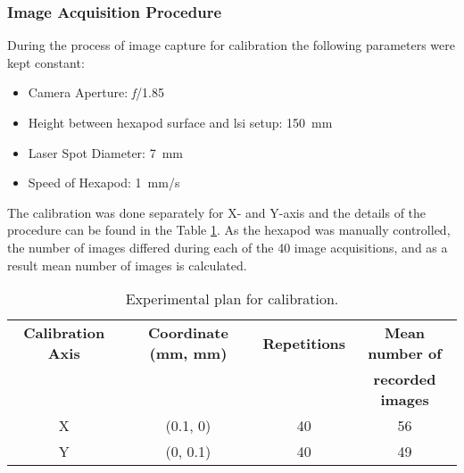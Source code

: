     \subsubsection*{Image Acquisition Procedure}\label{subsubsection:image_acq_calib}
        During the process of image capture for calibration the following parameters were kept constant:
        \begin{itemize}
            \item Camera Aperture: \emph{f}/1.85
            \item Height between hexapod surface and \gls{lsi} setup: \SI{150}{\milli\meter}
            \item Laser Spot Diameter: \SI{7}{\milli\meter}
            \item Speed of Hexapod: \SI{1}{\milli\meter/\second}
        \end{itemize}
        
        \noindent The calibration was done separately for X- and Y-axis and the details of the procedure can be found in the Table \ref{table:calibration_plan}. As the hexapod was manually controlled, the number of images differed during each of the 40 image acquisitions, and as a result mean number of images is calculated.

        \begin{table}[ht]
            \centering
            \footnotesize
            \begin{tabular}{cccc}
                \toprule
                \textbf{Calibration Axis} & \textbf{Coordinate (mm, mm)} & \textbf{Repetitions} & \textbf{Mean number of} \\
                 & & & \textbf{recorded images} \\
                \midrule
                X & (0.1, 0) & 40 & 56 \\
                Y & (0, 0.1) & 40 & 49 \\
                \bottomrule
            \end{tabular}
            \caption{Experimental plan for calibration.}
            \label{table:calibration_plan}
        \end{table}
    

